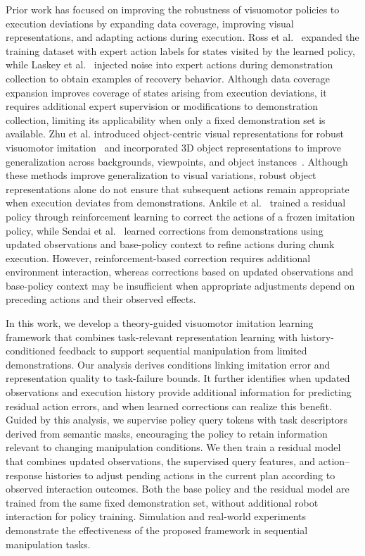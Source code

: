 Prior work has focused on improving the robustness of visuomotor policies
to execution deviations by expanding data coverage, improving visual
representations, and adapting actions during execution.
Ross et al.~\cite{ross2011} expanded the training dataset with expert
action labels for states visited by the learned policy, while
Laskey et al.~\cite{laskey2017dart} injected noise into expert actions
during demonstration collection to obtain examples of recovery behavior.
Although data coverage expansion improves coverage of states arising
from execution deviations, it requires additional expert supervision
or modifications to demonstration collection, limiting its applicability
when only a fixed demonstration set is available.
Zhu et al. introduced object-centric visual representations
for robust visuomotor imitation~\cite{zhu2023viola} and incorporated
3D object representations to improve generalization across
backgrounds, viewpoints, and object instances~\cite{zhu2023groot}.
Although these methods improve generalization to visual variations,
robust object representations alone do not ensure that subsequent
actions remain appropriate when execution deviates from demonstrations.
Ankile et al.~\cite{ankile2024resip} trained a residual policy through
reinforcement learning to correct the actions of a frozen imitation
policy, while Sendai et al.~\cite{a2c2} learned corrections from
demonstrations using updated observations and base-policy context
to refine actions during chunk execution.
However, reinforcement-based correction requires additional environment
interaction, whereas corrections based on updated observations and
base-policy context may be insufficient when appropriate adjustments
depend on preceding actions and their observed effects.

In this work, we develop a theory-guided visuomotor imitation learning
framework that combines task-relevant representation learning with
history-conditioned feedback to support sequential manipulation
from limited demonstrations.
Our analysis derives conditions linking imitation error and
representation quality to task-failure bounds.
It further identifies when updated observations and execution history
provide additional information for predicting residual action errors,
and when learned corrections can realize this benefit.
Guided by this analysis, we supervise policy query tokens with task descriptors derived from semantic masks,
encouraging the policy to retain information relevant to changing manipulation conditions.
We then train a residual model that combines updated observations,
the supervised query features, and action--response histories to
adjust pending actions in the current plan according to observed
interaction outcomes.
Both the base policy and the residual model are trained from the same
fixed demonstration set, without additional robot interaction
for policy training.
Simulation and real-world experiments demonstrate the effectiveness
of the proposed framework in sequential manipulation tasks.

